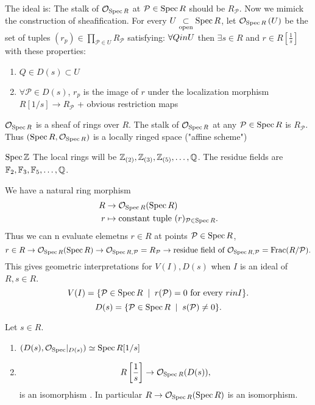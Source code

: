 The ideal is: The stalk of $\mathcal{O} _{\operatorname{Spec} R}$ at $\mathcal{P}  \in \operatorname{Spec} R$ should be $R_{\mathcal{P} }$. 
Now we mimick the construction of sheafification. 
For every $U \underset{\text{open}}{\subset} \operatorname{Spec} R$, let $\mathcal{O} _{\operatorname{Spec} R}\left( U \right) $ be the set of tuples $(r_p) \in \prod_{\mathcal{P}  \in U}R_\mathcal{P} $ satisfying:
$\forall Q \\in  U$ then $\exists s \in R$ and $r \in R[\frac{1}{s}]$ with these properties:
\begin{enumerate}
	\item $Q \in D(s) \subset U$ 
	\item $\forall \mathcal{P}  \in D(s)$, $r_p$ is the image of $r$ under the localization morphism $R[1 / s] \to R_{\mathcal{P} }$ + obvious restriction maps
\end{enumerate}
\begin{exercise}
	$\mathcal{O} _{\operatorname{Spec} R}$ is a sheaf of rings over $R$. The stalk of $\mathcal{O} _{\operatorname{Spec} R}$ at any $\mathcal{P}  \in \operatorname{Spec} R$ is $R_\mathcal{P} $. 
	Thus $(\operatorname{Spec} R, \mathcal{O} _{\operatorname{Spec} R})$ is a locally ringed space ("affine scheme")
\end{exercise}
\begin{example}
	$\operatorname{Spec} \mathbb{Z}$
	The local rings will be $\mathbb{Z}_{(2)}, \mathbb{Z}_{(3)}, \mathbb{Z}_{(5)}, \ldots, \mathbb{Q}$. 
	The residue fields are $\mathbb{F}_2, \mathbb{F}_3, \mathbb{F}_5, \ldots, \mathbb{Q}$.
\end{example}
\begin{note}
	We have a natural ring morphism 
	\begin{align*}
		R & \to \mathcal{O} _{\operatorname{Spec} R}(\operatorname{Spec} R)\\
		r & \mapsto \text{constant tuple }(r)_{\mathcal{P} \in \operatorname{Spec} R} 
	.\end{align*}
	Thus we can n evaluate elemetns $r \in R$ at points $\mathcal{P}  \in \operatorname{Spec} R$, 
	\[
		r \in R \to \mathcal{O} _{\operatorname{Spec} R}(\operatorname{Spec} R) \to \mathcal{O} _{\operatorname{Spec} R, \mathcal{P} } = R_{\mathcal{P} } \to \text{residue field of } \mathcal{O} _{\operatorname{Spec} R, \mathcal{P} } = \text{Frac}(R / \mathcal{P} )
	.\] 
	This gives geometric interpretations for $V(I) , D(s)$ when $I $ is an ideal of $R, s \in R$. 
	\[
		V(I) = \{ \mathcal{P}  \in \spec R \st r(\mathcal{P} )  = 0 \text{ for every } r \\in  I\} 
	.\] 
	\[
		D(s) = \{\mathcal{P}  \in \spec R \st s(\mathcal{P} ) \ne 0\} 
	.\] 
\end{note}
\begin{proposition}
	Let $s \in R$.
	\begin{enumerate}
		\item $(D(s), \mathcal{O} _{\operatorname{Spec}}|_{D(s)}) \simeq \operatorname{Spec} R[1 / s]$
		\item \[
				R\left[\frac{1}{s}\right] \to \mathcal{O} _{\operatorname{Spec} R}(D(s))
		,\] 
		is an isomorphism . In particular $R \to \mathcal{O} _{\operatorname{Spec} R}(\operatorname{Spec} R)$ is an isomorphism.
	\end{enumerate}
\end{proposition}
